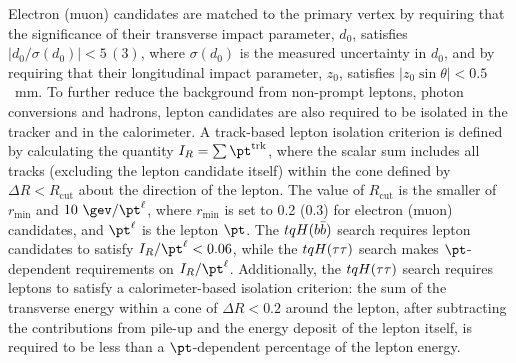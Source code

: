 Electron (muon) candidates are matched to the primary vertex by requiring that the significance of their transverse impact parameter, $d_0$, 
satisfies $|d_0/\sigma(d_0)|<5\,(3)$, where $\sigma(d_0)$ is the measured uncertainty in $d_0$,
and by requiring that their longitudinal impact parameter, $z_0$, satisfies $|z_0 \sin\theta|<0.5$~mm.
To further reduce the background from non-prompt leptons, photon conversions and hadrons, lepton candidates are also required to be isolated 
in the tracker and in the calorimeter.
A track-based lepton isolation criterion is defined by calculating the quantity $I_R = \sum \pt^{\textrm{trk}}$, where
the scalar sum includes all tracks (excluding the lepton candidate itself) within the cone defined by $\Delta R<R_{\textrm{cut}}$ about the %
direction of the lepton.  The value of $R_{\textrm{cut}}$ is the smaller of $r_{\textrm{min}}$ and $10~\gev/\pt^\ell$, where
$r_{\textrm{min}}$ is set to 0.2 (0.3) for electron (muon) candidates, and $\pt^\ell$ is the lepton $\pt$. 
The $tqH(b\bar{b})$ search requires lepton candidates to satisfy $I_R/\pt^\ell < 0.06$, while the $tqH(\tau\tau)$ search 
makes $\pt$-dependent requirements on $I_R/\pt^\ell$. Additionally, the $tqH(\tau\tau)$ search requires leptons to
satisfy a calorimeter-based isolation criterion: the sum of the transverse energy within a cone of
$\Delta R<0.2$ around the lepton, after subtracting the contributions
from pile-up and the energy deposit of the lepton itself, is required to be less than a $\pt$-dependent 
percentage of the lepton energy. 

